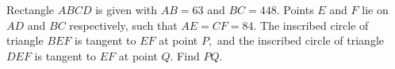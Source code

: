 Rectangle $ABCD$ is given with $AB=63$ and $BC=448.$ Points $E$ and $F$ lie on $AD$ and $BC$ respectively, such that $AE=CF=84.$ The inscribed circle of triangle $BEF$ is tangent to $EF$ at point $P,$ and the inscribed circle of triangle $DEF$ is tangent to $EF$ at point $Q.$ Find $PQ.$